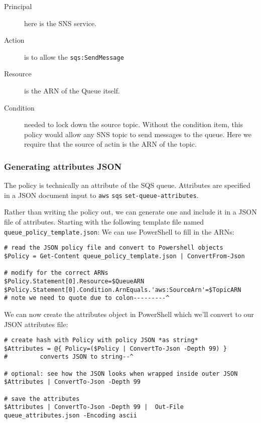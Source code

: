 \begin{description}
\item[Principal]
here is the SNS service.
\item[Action]
is to allow the \texttt{sqs:SendMessage}
\item[Resource]
is the ARN of the Queue itself.
\item[Condition]
  needed to lock down the source topic.
  Without the condition item, this policy would allow any SNS topic to send messages to the queue.
  Here we require that the source of actin is the ARN of the topic.
\end{description}

\subsubsection{Generating attributes JSON}
\label{generating-attributes-json}

The policy is technically an attribute of the SQS queue.
Attributes are specified in a JSON document input to \texttt{aws} \texttt{sqs}
\texttt{set-queue-attributes}.

Rather than writing the policy out, we can generate one and include it in a JSON file of attributes.
Starting with the following template file named \texttt{queue\_policy\_template.json}:
We can use PowerShell to fill in the ARNs:

\begin{verbatim}
# read the JSON policy file and convert to Powershell objects
$Policy = Get-Content queue_policy_template.json | ConvertFrom-Json

# modify for the correct ARNs
$Policy.Statement[0].Resource=$QueueARN
$Policy.Statement[0].Condition.ArnEquals.'aws:SourceArn'=$TopicARN
# note we need to quote due to colon---------^
\end{verbatim}

We can now create the attributes object in PowerShell which we'll convert to our JSON attributes file:

\begin{verbatim}
# create hash with Policy with policy JSON *as string*
$Attributes = @{ Policy=($Policy | ConvertTo-Json -Depth 99) }
#         converts JSON to string--^

# optional: see how the JSON looks when wrapped inside outer JSON
$Attributes | ConvertTo-Json -Depth 99

# save the attributes
$Attributes | ConvertTo-Json -Depth 99 |  Out-File queue_attributes.json -Encoding ascii
\end{verbatim}

